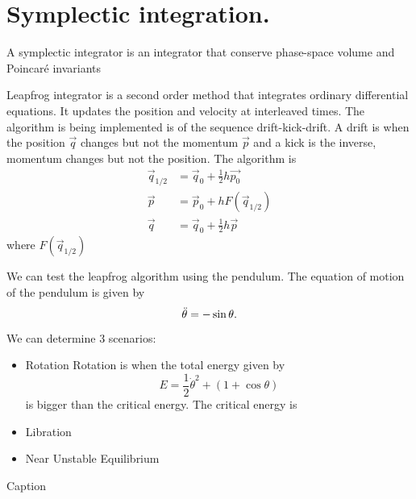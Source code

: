 \section{Symplectic integration.}


A symplectic integrator is an integrator that conserve phase-space volume and Poincar\' e invariants \cite{BinneyT_}

Leapfrog integrator is a second order method that integrates ordinary differential equations. It updates the position and velocity at interleaved times. The algorithm is being implemented is of the sequence drift-kick-drift. A drift is when the position $\Vec{q}$ changes but not the momentum $\Vec{p}$ and a kick is the inverse, momentum changes but not the position. The algorithm is
\begin{align*}
    \Vec{q}_{1/2}&=\Vec{q}_0+\frac{1}{2}h\Vec{p_0}\\
    \Vec{p}&=\Vec{p}_0 + h F(\Vec{q}_{1/2})\\
    \Vec{q}&=\Vec{q}_0 + \frac{1}{2}h\Vec{p}
\end{align*}
where $F(\Vec{q}_{1/2})$

We can test the leapfrog algorithm using the pendulum. 
The equation of motion of the pendulum is given by
\begin{equation}
    \Ddot{\theta}=-\sin\theta.
\end{equation}

We can determine 3 scenarios:
\begin{itemize}
    \item Rotation
    Rotation is when the total energy given by
    \begin{equation}
    E=\frac{1}{2}\Dot{\theta}^2+\left(1+\cos\theta\right)
    \end{equation}
    is bigger than the critical energy. The critical energy is 
    
    \item Libration
    \item Near Unstable Equilibrium
\end{itemize}

\begin{table}[]
    \centering

    \caption{Caption}
    \label{tab:PendulumIV}
\end{table}





\clearpage